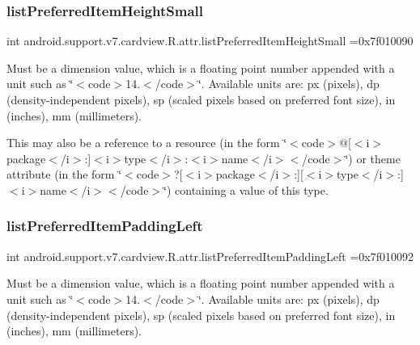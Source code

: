 \subsubsection{\texorpdfstring{list\+Preferred\+Item\+Height\+Small}{listPreferredItemHeightSmall}}
{\footnotesize\ttfamily int android.\+support.\+v7.\+cardview.\+R.\+attr.\+list\+Preferred\+Item\+Height\+Small =0x7f010090\hspace{0.3cm}{\ttfamily [static]}}

Must be a dimension value, which is a floating point number appended with a unit such as \char`\"{}$<$code$>$14.\+5sp$<$/code$>$\char`\"{}. Available units are\+: px (pixels), dp (density-\/independent pixels), sp (scaled pixels based on preferred font size), in (inches), mm (millimeters). 

This may also be a reference to a resource (in the form \char`\"{}$<$code$>$@\mbox{[}$<$i$>$package$<$/i$>$\+:\mbox{]}$<$i$>$type$<$/i$>$\+:$<$i$>$name$<$/i$>$$<$/code$>$\char`\"{}) or theme attribute (in the form \char`\"{}$<$code$>$?\mbox{[}$<$i$>$package$<$/i$>$\+:\mbox{]}\mbox{[}$<$i$>$type$<$/i$>$\+:\mbox{]}$<$i$>$name$<$/i$>$$<$/code$>$\char`\"{}) containing a value of this type. \mbox{\label{classandroid_1_1support_1_1v7_1_1cardview_1_1R_1_1attr_a7bc3c12c42966b895676e5dae546ee29}} 
\subsubsection{\texorpdfstring{list\+Preferred\+Item\+Padding\+Left}{listPreferredItemPaddingLeft}}
{\footnotesize\ttfamily int android.\+support.\+v7.\+cardview.\+R.\+attr.\+list\+Preferred\+Item\+Padding\+Left =0x7f010092\hspace{0.3cm}{\ttfamily [static]}}

Must be a dimension value, which is a floating point number appended with a unit such as \char`\"{}$<$code$>$14.\+5sp$<$/code$>$\char`\"{}. Available units are\+: px (pixels), dp (density-\/independent pixels), sp (scaled pixels based on preferred font size), in (inches), mm (millimeters). 

